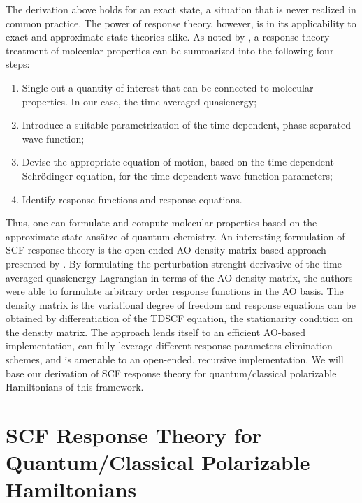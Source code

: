 The derivation above holds for an exact state, a situation that is never
realized in common practice. The power of response theory, however, is
in its applicability to exact and approximate state theories alike.
As noted by \citeauthor{Norman2011-ad}, a response theory treatment of
molecular properties can be summarized into the following four
steps:\autocite{Norman2011-ad}
\begin{enumerate}
    \item Single out a quantity of interest that can be connected to
      molecular properties. In our case, the time-averaged
      quasienergy;
    \item Introduce a suitable parametrization of the time-dependent,
      phase-separated wave function;
    \item Devise the appropriate equation of motion, based on the
      time-dependent Schr\"{o}dinger equation, for the time-dependent
      wave function parameters;
    \item Identify response functions and response equations.
\end{enumerate}
Thus, one can formulate and compute molecular properties based on
the approximate state ans\"{a}tze of quantum chemistry.
An interesting formulation of \acrshort{SCF} response theory is the
open-ended \acrshort{AO} density matrix-based approach presented by
\citeauthor{Thorvaldsen2008-sg}.\autocite{Thorvaldsen2008-sg}
By formulating the perturbation-strenght derivative of the time-averaged
quasienergy Lagrangian in terms of the \acrshort*{AO} density matrix,
the authors were able to formulate arbitrary order response functions
in the \acrshort*{AO} basis.
The density matrix is the variational degree of freedom and response
equations can be obtained by differentiation of the \gls{TDSCF}
equation, the stationarity condition on the density matrix.
The approach lends itself to an efficient \acrshort*{AO}-based
implementation,\autocite{Larsen2000-hj, Kjaergaard2008-hy} can fully
leverage different response parameters elimination
schemes,\autocite{Thorvaldsen2008-sg, Kristensen2008-hv} and is amenable
to an open-ended, recursive implementation.\autocite{Ringholm2014-gx,
Friese2015-kb, Friese2015-bu}
We will base our derivation of \acrshort*{SCF} response theory for
quantum/classical polarizable Hamiltonians of this framework.

\section{SCF Response Theory for Quantum/Classical Polarizable Hamiltonians}\label{sec:csm-response}

